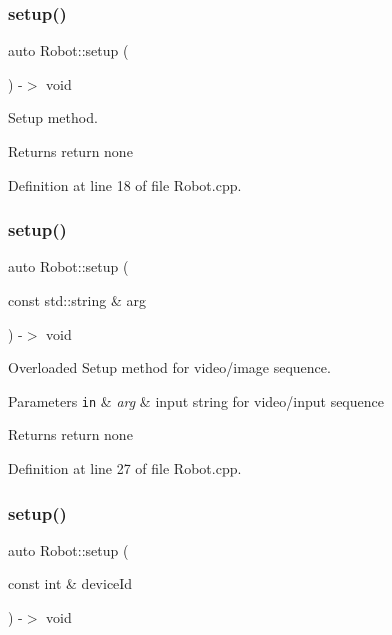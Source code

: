 \subsubsection{\texorpdfstring{setup()}{setup()}\hspace{0.1cm}{\footnotesize\ttfamily [1/3]}}
{\footnotesize\ttfamily auto Robot\+::setup (\begin{DoxyParamCaption}{ }\end{DoxyParamCaption}) -\/$>$ void}



Setup method. 

\begin{DoxyReturn}{Returns}
return none 
\end{DoxyReturn}


Definition at line 18 of file Robot.\+cpp.

\mbox{\label{class_robot_a4d757fd25b06c57608c1d69f30581171}} 
\subsubsection{\texorpdfstring{setup()}{setup()}\hspace{0.1cm}{\footnotesize\ttfamily [2/3]}}
{\footnotesize\ttfamily auto Robot\+::setup (\begin{DoxyParamCaption}\item[{const std\+::string \&}]{arg }\end{DoxyParamCaption}) -\/$>$ void}



Overloaded Setup method for video/image sequence. 


\begin{DoxyParams}[1]{Parameters}
\mbox{\tt in}  & {\em arg} & input string for video/input sequence\\
\hline
\end{DoxyParams}
\begin{DoxyReturn}{Returns}
return none 
\end{DoxyReturn}


Definition at line 27 of file Robot.\+cpp.

\mbox{\label{class_robot_a20e8d1137e9a7ebcf1fe1c3789e509e8}} 
\subsubsection{\texorpdfstring{setup()}{setup()}\hspace{0.1cm}{\footnotesize\ttfamily [3/3]}}
{\footnotesize\ttfamily auto Robot\+::setup (\begin{DoxyParamCaption}\item[{const int \&}]{device\+Id }\end{DoxyParamCaption}) -\/$>$  void}



